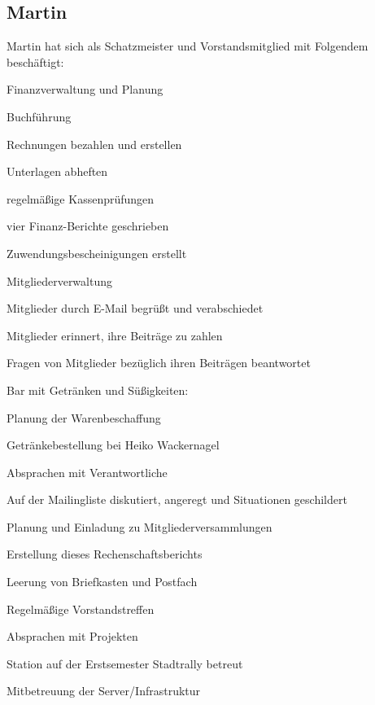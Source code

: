 \documentclass[ngerman]{scrartcl}
\begin{document}
\subsection{Martin}
Martin hat sich als Schatzmeister und Vorstandsmitglied mit Folgendem beschäftigt:
\begin{compactitem}
	\item Finanzverwaltung und Planung
	\begin{compactitem}
		\item Buchführung
		\item Rechnungen bezahlen und erstellen
		\item Unterlagen abheften
		\item regelmäßige Kassenprüfungen
		\item vier Finanz-Berichte geschrieben
		\item Zuwendungsbescheinigungen erstellt
	\end{compactitem}
	\item Mitgliederverwaltung
	\begin{compactitem}
		\item Mitglieder durch E-Mail begrüßt und verabschiedet
		\item Mitglieder erinnert, ihre Beiträge zu zahlen
		\item Fragen von Mitglieder bezüglich ihren Beiträgen beantwortet
	\end{compactitem}
	\item Bar mit Getränken und Süßigkeiten:
	\begin{compactitem}
		\item Planung der Warenbeschaffung
		\item Getränkebestellung bei Heiko Wackernagel
		\item Absprachen mit Verantwortliche
	\end{compactitem}
	\item Auf der Mailingliste diskutiert, angeregt und Situationen geschildert
	\item Planung und Einladung zu Mitgliederversammlungen
	\item Erstellung dieses Rechenschaftsberichts
	\item Leerung von Briefkasten und Postfach
	\item Regelmäßige Vorstandstreffen
	\item Absprachen mit Projekten
	\item Station auf der Erstsemester Stadtrally betreut
	\item Mitbetreuung der Server/Infrastruktur
\end{compactitem}
\end{document}
